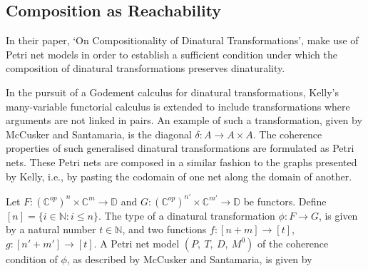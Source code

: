 \documentclass[../../Dissertation.tex]{subfiles}
\begin{document}
\subsection{Composition as Reachability}
In their paper, `On Compositionality of Dinatural Transformations',  make use of Petri net models in order to establish a sufficient condition under which the composition of dinatural transformations preserves dinaturality. 
\par
In the pursuit of a Godement calculus for dinatural transformations, Kelly's many-variable functorial calculus is extended to include transformations where arguments are not linked in pairs. An example of such a transformation, given by McCusker and Santamaria, is the diagonal $\delta : A \rightarrow A \times A$. The coherence properties of such generalised dinatural transformations are formulated as Petri nets. These Petri nets are composed in a similar fashion to the graphs presented by Kelly, i.e., by pasting the codomain of one net along the domain of another. 
\par
Let $F : (\mathbb{C}^{op})^n \times \mathbb{C}^m \rightarrow \mathbb{D}$ and $G : (\mathbb{C}^{op})^{n'} \times \mathbb{C}^{m'} \rightarrow \mathbb{D}$ be functors. Define $[n] = \{i \in \mathbb{N} : i \leq n\}$. The type of a dinatural transformation $\phi : F \rightarrow G$, is given by a natural number $t \in \mathbb{N}$, and two functions $f : [n + m] \rightarrow [t]$, $g : [n' + m'] \rightarrow [t]$. A Petri net model $(P,\ T,\ D,\ M^0)$ of the coherence condition of $\phi$, as described by McCusker and Santamaria, is given by
\end{document}
